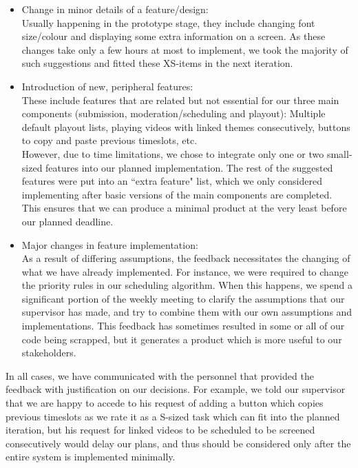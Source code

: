 ﻿\documentclass[a4paper, titlepage]{article}
\begin{document}
\begin{itemize}

  \item Change in minor details of a feature/design: \\
        Usually happening in the prototype stage, they include changing font size/colour and displaying some extra information on a screen. As these changes take only a few hours at most to implement, we took the majority of such suggestions and fitted these XS-items in the next iteration.

  \item Introduction of new, peripheral features: \\
        These include features that are related but not essential for our three main components (submission, moderation/scheduling and playout): Multiple default playout lists, playing videos with linked themes consecutively, buttons to copy and paste previous timeslots, etc. \\
        However, due to time limitations, we chose to integrate only one or two small-sized features into our planned implementation. The rest of the suggested features were put into an ``extra feature" list, which we only considered implementing after basic versions of the main components are completed. This ensures that we can produce a minimal product at the very least before our planned deadline.

  \item Major changes in feature implementation: \\
        As a result of differing assumptions, the feedback necessitates the changing of what we have already implemented. For instance, we were required to change the priority rules in our scheduling algorithm. When this happens, we spend a significant portion of the weekly meeting to clarify the assumptions that our supervisor has made, and try to combine them with our own assumptions and implementations. This feedback has sometimes resulted in some or all of our code being scrapped, but it generates a product which is more useful to our stakeholders.

\end{itemize}

In all cases, we have communicated with the personnel that provided the
feedback with justification on our decisions. For example, we told
our supervisor that we are happy to accede to his request of adding a button which copies previous timeslots as we rate it as a S-sized task which can fit into the planned iteration, but his request for linked videos to be scheduled to be screened consecutively would delay our plans, and thus should be considered only after the entire system is implemented minimally.
\end{document}
